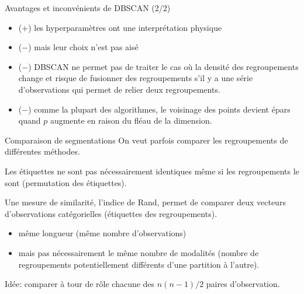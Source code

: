 \documentclass[
  ignorenonframetext,
]{beamer}
\providecommand{\tightlist}{%
  \setlength{\itemsep}{0pt}\setlength{\parskip}{0pt}}\usepackage{longtable,booktabs,array}
\begin{document}
\begin{frame}{Avantages et inconvénients de DBSCAN (2/2)}
\protect\hypertarget{avantages-et-inconvuxe9nients-de-dbscan-22}{}
\begin{itemize}
\tightlist
\item
  (\(+\)) les hyperparamètres ont une interprétation physique
\item
  (\(-\)) mais leur choix n'est pas aisé
\item
  (\(-\)) DBSCAN ne permet pas de traiter le cas où la densité des
  regroupements change et risque de fusionner des regroupements s'il y a
  une série d'observations qui permet de relier deux regroupements.
\item
  (\(-\)) comme la plupart des algorithmes, le voisinage des points
  devient épars quand \(p\) augmente en raison du fléau de la dimension.
\end{itemize}
\end{frame}

\begin{frame}{Comparaison de segmentations}
\protect\hypertarget{comparaison-de-segmentations}{}
On veut parfois comparer les regroupements de différentes méthodes.

Les étiquettes ne sont pas nécessairement identiques même si les
regroupements le sont (permutation des étiquettes).

Une mesure de similarité, l'indice de Rand, permet de comparer deux
vecteurs d'observations catégorielles (étiquettes des regroupements).

\begin{itemize}
\tightlist
\item
  même longueur (même nombre d'observations)
\item
  mais pas nécessairement le même nombre de modalités (nombre de
  regroupements potentiellement différents d'une partition à l'autre).
\end{itemize}

Idée: comparer à tour de rôle chacune des \(n(n-1)/2\) paires
d'observation.
\end{frame}
\end{document}
